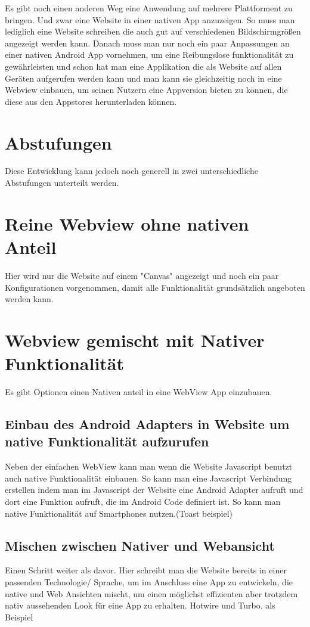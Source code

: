 Es gibt noch einen anderen Weg eine Anwendung auf mehrere Plattforment zu bringen.
Und zwar eine Website in einer nativen App anzuzeigen. So muss man lediglich eine Website schreiben die auch gut auf verschiedenen Bildschirmgrößen angezeigt werden kann. Danach muss man nur noch ein paar Anpassungen an einer nativen Android App vornehmen, um eine Reibungslose funktionalität zu gewährleisten und schon hat man eine Applikation die als Website auf allen Geräten aufgerufen werden kann und man kann sie gleichzeitig noch in eine Webview einbauen, um seinen Nutzern eine Appversion bieten zu können, die diese aus den Appstores herunterladen können.
\section{Abstufungen}
Diese Entwicklung kann jedoch noch generell in zwei unterschiedliche Abstufungen unterteilt werden. 
\section{Reine Webview ohne nativen Anteil}
Hier wird nur die Website auf einem "Canvas" angezeigt und noch ein paar Konfigurationen vorgenommen, damit alle Funktionalität grundsätzlich angeboten werden kann.

\section{Webview gemischt mit Nativer Funktionalität}
Es gibt Optionen einen Nativen anteil in eine WebView App einzubauen.
\subsection{Einbau des Android Adapters in Website um native Funktionalität aufzurufen}
Neben der einfachen WebView kann man wenn die Website Javascript benutzt auch native Funktionalität einbauen. So kann man eine Javascript Verbindung erstellen indem man im Javascript der Website eine Android Adapter aufruft und dort eine Funktion aufruft, die im Android Code definiert ist. So kann man native Funktionalität auf Smartphones nutzen.(Toast beispiel)
\subsection{Mischen zwischen Nativer und Webansicht}
Einen Schritt weiter als davor. Hier schreibt man die Website bereits in einer passenden Technologie/ Sprache, um im Anschluss eine App zu entwickeln, die native und Web Ansichten mischt, um einen möglichst effizienten aber trotzdem nativ aussehenden Look für eine App zu erhalten. Hotwire und Turbo. als Beispiel





